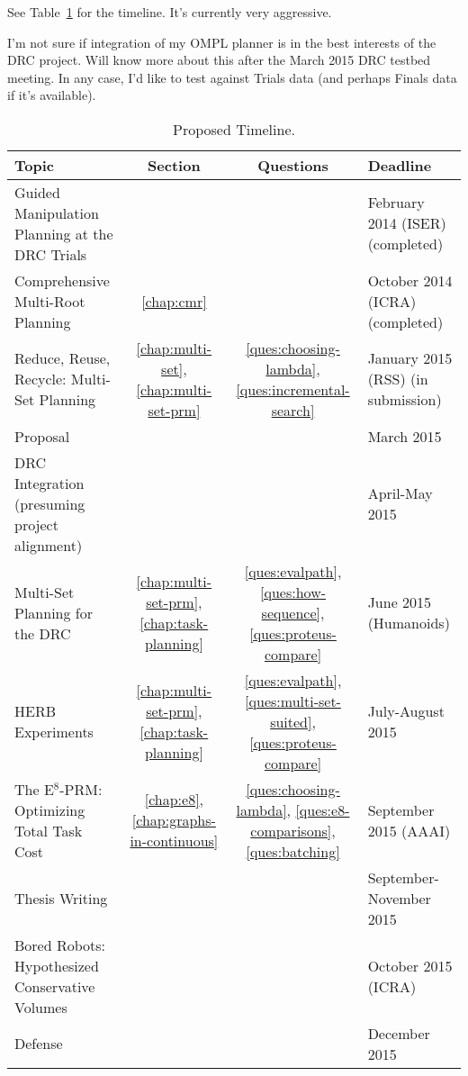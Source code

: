 See Table~\ref{table:proposed-timeline} for the timeline.
It's currently very aggressive.

I'm not sure if integration of my OMPL planner
is in the best interests of the DRC project.
Will know more about this after the March 2015 DRC testbed meeting.
In any case, I'd like to test against Trials data
(and perhaps Finals data if it's available).

\begin{table}
\begin{widepage}
   \centering
   {
   \renewcommand{\arraystretch}{1.5}
   \begin{tabular}{lccl}
   \toprule
   {\bf Topic} & {\bf Section} & {\bf Questions} & {\bf Deadline} \\
   \midrule
   Guided Manipulation Planning at the DRC Trials \cite{dellin2014drc}
      & %
      &
      & February 2014 (ISER) (completed) \\
   Comprehensive Multi-Root Planning \cite{dellin2015cmr}
      & \ref{chap:cmr}
      &
      & October 2014 (ICRA) (completed) \\
   Reduce, Reuse, Recycle: Multi-Set Planning \cite{dellin2015multiset}
      & \ref{chap:multi-set}, \ref{chap:multi-set-prm}
      & \ref{ques:choosing-lambda}, \ref{ques:incremental-search}
      & January 2015 (RSS) (in submission) \\
   \midrule
   Proposal
      & & & March 2015 \\
   DRC Integration (presuming project alignment)
      & & & April-May 2015 \\
   Multi-Set Planning for the DRC
      & \ref{chap:multi-set-prm}, \ref{chap:task-planning}
      & \ref{ques:evalpath}, \ref{ques:how-sequence},
        \ref{ques:proteus-compare}
      & June 2015 (Humanoids) \\
   HERB Experiments
      & \ref{chap:multi-set-prm}, \ref{chap:task-planning}
      & \ref{ques:evalpath}, \ref{ques:multi-set-suited},
        \ref{ques:proteus-compare}
      & July-August 2015 \\
   The E$^8$-PRM: Optimizing Total Task Cost
      & \ref{chap:e8}, \ref{chap:graphs-in-continuous}
      & \ref{ques:choosing-lambda}, \ref{ques:e8-comparisons},
        \ref{ques:batching}
      & September 2015 (AAAI) \\
   Thesis Writing
      & & & September-November 2015 \\
   Bored Robots: Hypothesized Conservative Volumes
      & & & October 2015 (ICRA) \\
   Defense
      & & & December 2015 \\
   \bottomrule
   \end{tabular}
   } %
\end{widepage}
\caption{Proposed Timeline. }
\label{table:proposed-timeline}
\end{table}

